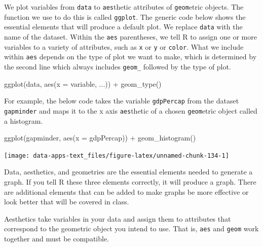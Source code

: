 \documentclass[
]{book}
\makeatletter
\newenvironment{Shaded}{\begin{snugshade}}{\end{snugshade}}
\newcommand{\AttributeTok}[1]{\textcolor[rgb]{0.61,0.61,0.61}{#1}}
\newcommand{\FunctionTok}[1]{\textcolor[rgb]{0,0,0}{#1}}
\newcommand{\NormalTok}[1]{#1}
\newcommand{\SpecialCharTok}[1]{\textcolor[rgb]{0,0,0}{#1}}
\newenvironment{kframe}{%
\medskip{}
\setlength{\fboxsep}{.8em}
 \def\at@end@of@kframe{}%
 \ifinner\ifhmode%
  \def\at@end@of@kframe{\end{minipage}}%
  \begin{minipage}{\columnwidth}%
 \fi\fi%
 \def\FrameCommand##1{\hskip\@totalleftmargin \hskip-\fboxsep
 \colorbox{shadecolor}{##1}\hskip-\fboxsep
     \hskip-\linewidth \hskip-\@totalleftmargin \hskip\columnwidth}%
 \MakeFramed {\advance\hsize-\width
   \@totalleftmargin\z@ \linewidth\hsize
   \@setminipage}}%
 {\par\unskip\endMakeFramed%
 \at@end@of@kframe}
\renewenvironment{Shaded}{\begin{kframe}}{\end{kframe}}
\makeatother
\begin{document}
We plot variables from \texttt{data} to \texttt{aes}thetic attributes of \texttt{geom}etric objects. The function we use to do this is called \texttt{ggplot}. The generic code below shows the essential elements that will produce a default plot. We replace \texttt{data} with the name of the dataset. Within the \texttt{aes} parentheses, we tell R to assign one or more variables to a variety of attributes, such as \texttt{x} or \texttt{y} or \texttt{color}. What we include within \texttt{aes} depends on the type of plot we want to make, which is determined by the second line which always includes \texttt{geom\_} followed by the type of plot.

\begin{Shaded}
\begin{Highlighting}[]
\FunctionTok{ggplot}\NormalTok{(data, }\FunctionTok{aes}\NormalTok{(}\AttributeTok{x =}\NormalTok{ variable, ...)) }\SpecialCharTok{+}
  \FunctionTok{geom\_type}\NormalTok{()}
\end{Highlighting}
\end{Shaded}

For example, the below code takes the variable \texttt{gdpPercap} from the dataset \texttt{gapminder} and maps it to the x axis \texttt{aes}thetic of a chosen \texttt{geom}etric object called a histogram.

\begin{Shaded}
\begin{Highlighting}[]
\FunctionTok{ggplot}\NormalTok{(gapminder, }\FunctionTok{aes}\NormalTok{(}\AttributeTok{x =}\NormalTok{ gdpPercap)) }\SpecialCharTok{+}
  \FunctionTok{geom\_histogram}\NormalTok{()}
\end{Highlighting}
\end{Shaded}

\begin{center}\texttt{[image: data-apps-text\_files/figure-latex/unnamed-chunk-134-1]} \end{center}

Data, aesthetics, and geometries are the essential elements needed to generate a graph. If you tell R these three elements correctly, it will produce a graph. There are additional elements that can be added to make graphs be more effective or look better that will be covered in class.

Aesthetics take variables in your data and assign them to attributes that correspond to the geometric object you intend to use. That is, \texttt{aes} and \texttt{geom} work together and must be compatible.
\end{document}

